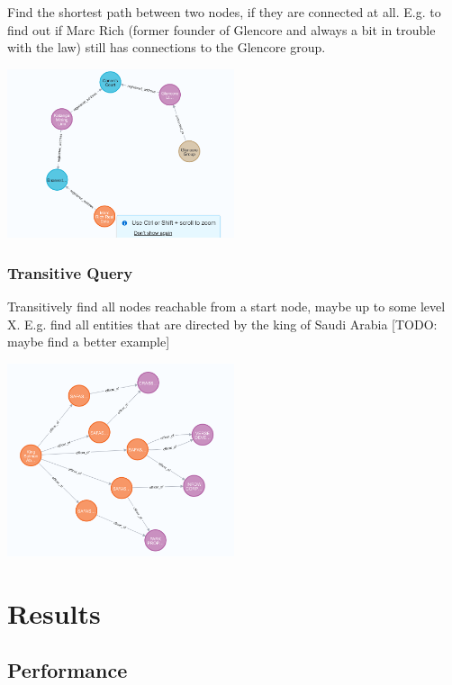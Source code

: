 \documentclass[11pt, a4paper,oneside,chapterprefix=false]{scrbook}
\begin{document}
Find the shortest path between two nodes, if they are connected at all. E.g. to find out if Marc Rich (former founder of Glencore and always a bit in trouble with the law) still has connections to the Glencore group.

\includegraphics*[width=0.5\textwidth]{figures/query_shortest_path.png} \hfill

\subsection{Transitive Query}

Transitively find all nodes reachable from a start node, maybe up to some level X. E.g. find all entities that are directed by the king of Saudi Arabia [TODO: maybe find a better example]

\includegraphics*[width=0.5\textwidth]{figures/query_transitive.png} \hfill

\chapter{Results} \label{chp:results}



\section{Performance} \label{sec:performance}
\end{document}

